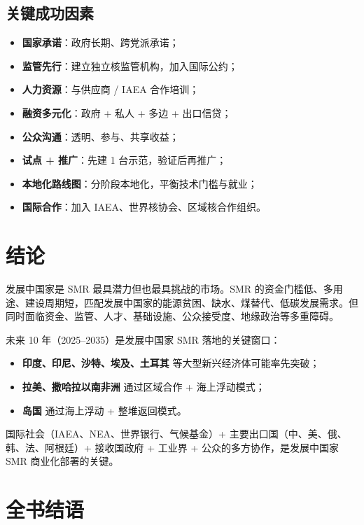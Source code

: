 \documentclass[
  UTF8,
  scheme=plain,
  fontsize=10pt,
  openany
]{ctexbook}
\begin{document}
\subsection{关键成功因素}\label{ux5173ux952eux6210ux529fux56e0ux7d20}

\begin{itemize}
\tightlist
\item
  \textbf{国家承诺}：政府长期、跨党派承诺；
\item
  \textbf{监管先行}：建立独立核监管机构，加入国际公约；
\item
  \textbf{人力资源}：与供应商 / IAEA 合作培训；
\item
  \textbf{融资多元化}：政府 + 私人 + 多边 + 出口信贷；
\item
  \textbf{公众沟通}：透明、参与、共享收益；
\item
  \textbf{试点 + 推广}：先建 1 台示范，验证后再推广；
\item
  \textbf{本地化路线图}：分阶段本地化，平衡技术门槛与就业；
\item
  \textbf{国际合作}：加入 IAEA、世界核协会、区域核合作组织。
\end{itemize}

\section{结论}\label{ux7ed3ux8bba-8}

发展中国家是 SMR 最具潜力但也最具挑战的市场。SMR
的资金门槛低、多用途、建设周期短，匹配发展中国家的能源贫困、缺水、煤替代、低碳发展需求。但同时面临资金、监管、人才、基础设施、公众接受度、地缘政治等多重障碍。

未来 10 年（2025--2035）是发展中国家 SMR 落地的关键窗口：

\begin{itemize}
\tightlist
\item
  \textbf{印度、印尼、沙特、埃及、土耳其} 等大型新兴经济体可能率先突破；
\item
  \textbf{拉美、撒哈拉以南非洲} 通过区域合作 + 海上浮动模式；
\item
  \textbf{岛国} 通过海上浮动 + 整堆返回模式。
\end{itemize}

国际社会（IAEA、NEA、世界银行、气候基金）+
主要出口国（中、美、俄、韩、法、阿根廷）+ 接收国政府 + 工业界 +
公众的多方协作，是发展中国家 SMR 商业化部署的关键。

\section{全书结语}\label{ux5168ux4e66ux7ed3ux8bed}
\end{document}
